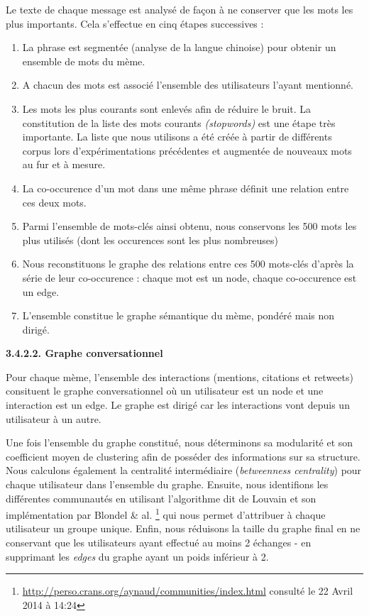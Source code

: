 Le texte de chaque message est analys\'e de fa\c{c}on \`a ne conserver
que les mots les plus importants. Cela s{\textquoteright}effectue en
cinq \'etapes successives : 

\begin{enumerate}
\item La phrase est segment\'ee (analyse de la langue chinoise) pour
obtenir un ensemble de mots du m\`eme.
\item A chacun des mots est associ\'e l{\textquoteright}ensemble des
utilisateurs l{\textquoteright}ayant mentionn\'e.
\item Les mots les plus courants sont enlev\'es afin de r\'eduire le
bruit. La constitution de la liste des mots courants
\textit{(stopwords) }est une \'etape tr\`es importante. La liste que
nous utilisons a \'et\'e cr\'e\'ee \`a partir de diff\'erents corpus
lors d{\textquoteright}exp\'erimentations pr\'ec\'edentes et
augment\'ee de nouveaux mots au fur et \`a mesure.
\item La co-occurence d{\textquoteright}un mot dans une m\^eme phrase
d\'efinit une relation entre ces deux mots.
\item Parmi l{\textquoteright}ensemble de mots-cl\'es ainsi obtenu, nous
conservons les 500 mots les plus utilis\'es (dont les occurences sont
les plus nombreuses) 
\item Nous reconstituons le graphe des relations entre ces 500
mots-cl\'es d{\textquoteright}apr\`es la s\'erie de leur co-occurence :
chaque mot est un node, chaque co-occurence est un edge.
\item L{\textquoteright}ensemble constitue le graphe s\'emantique du
m\`eme, pond\'er\'e mais non dirig\'e.
\end{enumerate}
\textbf{3.4.2.2. Graphe conversationnel}

Pour chaque m\`eme, l{\textquoteright}ensemble des interactions
(mentions, citations et retweets) consituent le graphe conversationnel
o\`u un utilisateur est un node et une interaction est un edge. Le
graphe est dirig\'e car les interactions vont depuis un utilisateur \`a
un autre. 

Une fois l{\textquoteright}ensemble du graphe constitu\'e, nous
d\'eterminons sa modularit\'e et son coefficient moyen de clustering
afin de poss\'eder des informations sur sa structure. Nous calculons
\'egalement la centralit\'e interm\'ediaire (\textit{betweenness
centrality}) pour chaque utilisateur dans l{\textquoteright}ensemble du
graphe. Ensuite, nous identifions les diff\'erentes communaut\'es en
utilisant l{\textquoteright}algorithme dit de Louvain et son
impl\'ementation par Blondel \& al. \citep{Blondel2008}\footnote{
\url{http://perso.crans.org/aynaud/communities/index.html} consult\'e
le 22 Avril 2014 \`a 14:24} qui nous permet d{\textquoteright}attribuer
\`a chaque utilisateur un groupe unique. Enfin, nous r\'eduisons la
taille du graphe final en ne conservant que les utilisateurs ayant
effectu\'e au moins 2 \'echanges - en supprimant les \textit{edges} du
graphe ayant un poids inf\'erieur \`a 2.

